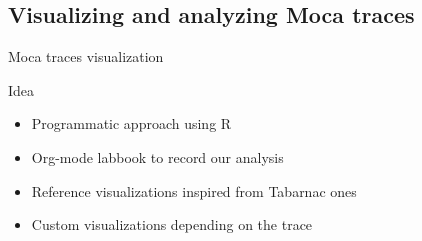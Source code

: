 \documentclass[xcolor={usenames,dvipsnames},hyperref={pdfusetitle}]{beamer}
\begin{document}
\subsection*{Visualizing and analyzing Moca traces}

\begin{frame}{Moca traces visualization}
    \begin{block}{Idea}
        \begin{itemize}
            \item Programmatic approach using R
            \item Org-mode labbook to record our analysis
            \item Reference visualizations inspired from Tabarnac ones
            \item Custom visualizations depending on the trace
        \end{itemize}
    \end{block}
\end{frame}
\end{document}
